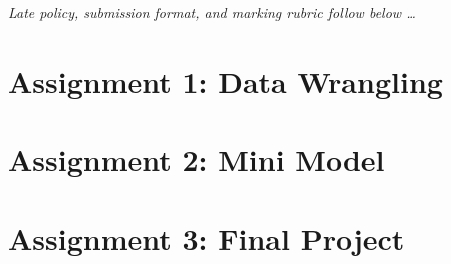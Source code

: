 \documentclass[
  letterpaper,
  DIV=11,
  numbers=noendperiod]{scrreprt}
\begin{document}
\emph{Late policy, submission format, and marking rubric follow below
\ldots{}}

\hypertarget{assignment-1-data-wrangling}{%
\chapter*{Assignment 1: Data
Wrangling}\label{assignment-1-data-wrangling}}


\hypertarget{assignment-2-mini-model}{%
\chapter*{Assignment 2: Mini Model}\label{assignment-2-mini-model}}


\hypertarget{assignment-3-final-project}{%
\chapter*{Assignment 3: Final
Project}\label{assignment-3-final-project}}

\end{document}
